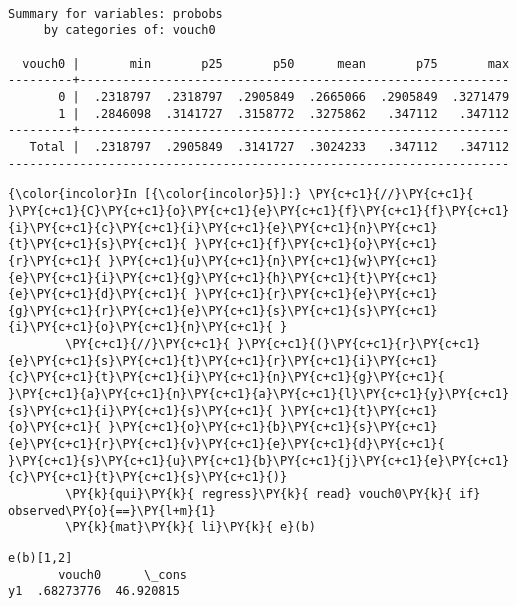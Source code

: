 \documentclass[11pt,notitlepage]{article}\usepackage[]{graphicx}\usepackage[]{color}
\makeatletter
\newenvironment{kframe}{%
 \def\at@end@of@kframe{}%
 \ifinner\ifhmode%
  \def\at@end@of@kframe{\end{minipage}}%
  \begin{minipage}{\columnwidth}%
 \fi\fi%
 \def\FrameCommand##1{\hskip\@totalleftmargin \hskip-\fboxsep
 \colorbox{shadecolor}{##1}\hskip-\fboxsep
     \hskip-\linewidth \hskip-\@totalleftmargin \hskip\columnwidth}%
 \MakeFramed {\advance\hsize-\width
   \@totalleftmargin\z@ \linewidth\hsize
   \@setminipage}}%
 {\par\unskip\endMakeFramed%
 \at@end@of@kframe}
\newenvironment{knitrout}{}{} %
\makeatother
\begin{document}
\begin{knitrout}
\begin{kframe}
    \begin{Verbatim}[commandchars=\\\{\}]

Summary for variables: probobs
     by categories of: vouch0 

  vouch0 |       min       p25       p50      mean       p75       max
---------+------------------------------------------------------------
       0 |  .2318797  .2318797  .2905849  .2665066  .2905849  .3271479
       1 |  .2846098  .3141727  .3158772  .3275862   .347112   .347112
---------+------------------------------------------------------------
   Total |  .2318797  .2905849  .3141727  .3024233   .347112   .347112
----------------------------------------------------------------------

    \end{Verbatim}

    \begin{Verbatim}[commandchars=\\\{\}]
{\color{incolor}In [{\color{incolor}5}]:} \PY{c+c1}{//}\PY{c+c1}{ }\PY{c+c1}{C}\PY{c+c1}{o}\PY{c+c1}{e}\PY{c+c1}{f}\PY{c+c1}{f}\PY{c+c1}{i}\PY{c+c1}{c}\PY{c+c1}{i}\PY{c+c1}{e}\PY{c+c1}{n}\PY{c+c1}{t}\PY{c+c1}{s}\PY{c+c1}{ }\PY{c+c1}{f}\PY{c+c1}{o}\PY{c+c1}{r}\PY{c+c1}{ }\PY{c+c1}{u}\PY{c+c1}{n}\PY{c+c1}{w}\PY{c+c1}{e}\PY{c+c1}{i}\PY{c+c1}{g}\PY{c+c1}{h}\PY{c+c1}{t}\PY{c+c1}{e}\PY{c+c1}{d}\PY{c+c1}{ }\PY{c+c1}{r}\PY{c+c1}{e}\PY{c+c1}{g}\PY{c+c1}{r}\PY{c+c1}{e}\PY{c+c1}{s}\PY{c+c1}{s}\PY{c+c1}{i}\PY{c+c1}{o}\PY{c+c1}{n}\PY{c+c1}{ }
        \PY{c+c1}{//}\PY{c+c1}{ }\PY{c+c1}{(}\PY{c+c1}{r}\PY{c+c1}{e}\PY{c+c1}{s}\PY{c+c1}{t}\PY{c+c1}{r}\PY{c+c1}{i}\PY{c+c1}{c}\PY{c+c1}{t}\PY{c+c1}{i}\PY{c+c1}{n}\PY{c+c1}{g}\PY{c+c1}{ }\PY{c+c1}{a}\PY{c+c1}{n}\PY{c+c1}{a}\PY{c+c1}{l}\PY{c+c1}{y}\PY{c+c1}{s}\PY{c+c1}{i}\PY{c+c1}{s}\PY{c+c1}{ }\PY{c+c1}{t}\PY{c+c1}{o}\PY{c+c1}{ }\PY{c+c1}{o}\PY{c+c1}{b}\PY{c+c1}{s}\PY{c+c1}{e}\PY{c+c1}{r}\PY{c+c1}{v}\PY{c+c1}{e}\PY{c+c1}{d}\PY{c+c1}{ }\PY{c+c1}{s}\PY{c+c1}{u}\PY{c+c1}{b}\PY{c+c1}{j}\PY{c+c1}{e}\PY{c+c1}{c}\PY{c+c1}{t}\PY{c+c1}{s}\PY{c+c1}{)}
        \PY{k}{qui}\PY{k}{ regress}\PY{k}{ read} vouch0\PY{k}{ if} observed\PY{o}{==}\PY{l+m}{1}
        \PY{k}{mat}\PY{k}{ li}\PY{k}{ e}(b)
\end{Verbatim}

    \begin{Verbatim}[commandchars=\\\{\}]
e(b)[1,2]
       vouch0      \_cons
y1  .68273776  46.920815

    \end{Verbatim}


\end{kframe}
\end{knitrout}
\end{document}
